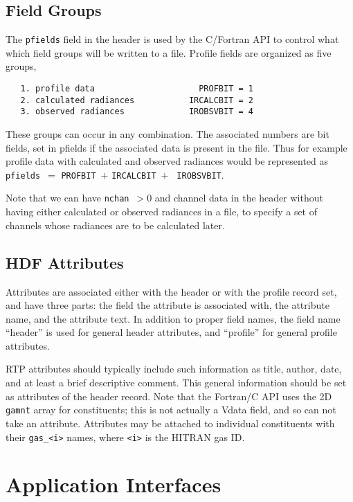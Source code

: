 \documentclass[12pt]{article}
\begin{document}
\subsection{Field Groups}

The {\tt pfields} field in the header is used by the C/Fortran API
to control what which field groups will be written to a file.  Profile
fields are organized as five groups,

\begin{verbatim}
   1. profile data                     PROFBIT = 1
   2. calculated radiances           IRCALCBIT = 2
   3. observed radiances             IROBSVBIT = 4
\end{verbatim}

These groups can occur in any combination.  The associated numbers
are bit fields, set in pfields if the associated data is present
in the file.  Thus for example profile data with calculated and
observed radiances would be represented as
{\tt pfields}~$=$ {\tt PROFBIT}~$+$ {\tt IRCALCBIT}~$+$ {\tt
IROBSVBIT}.

Note that we can have {\tt nchan}~$>0$ and channel data in the
header without having either calculated or observed radiances in a
file, to specify a set of channels whose radiances are to be
calculated later.


\subsection{HDF Attributes}

Attributes are associated either with the header or with the
profile record set, and have three parts: the field the attribute
is associated with, the attribute name, and the attribute text.  In
addition to proper field names, the field name ``header'' is used
for general header attributes, and ``profile'' for general profile
attributes.

RTP attributes should typically include such information as title,
author, date, and at least a brief descriptive comment.  This
general information should be set as attributes of the header
record.  Note that the Fortran/C API uses the 2D {\tt gamnt} array
for constituents; this is not actually a Vdata field, and so can not
take an attribute.  Attributes may be attached to individual
constituents with their {\tt gas\_<i>} names, where {\tt <i>} is the
HITRAN gas ID.


\section{Application Interfaces}
\end{document}
